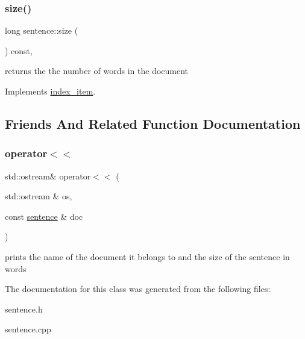 \subsubsection{\texorpdfstring{size()}{size()}}
{\footnotesize\ttfamily long sentence\+::size (\begin{DoxyParamCaption}{ }\end{DoxyParamCaption}) const\hspace{0.3cm}{\ttfamily [override]}, {\ttfamily [virtual]}}

returns the the number of words in the document 

Implements \hyperlink{classindex__item_a7c16d6bca513663fab66d40a6c0289a9}{index\+\_\+item}.



\subsection{Friends And Related Function Documentation}
\mbox{\label{classsentence_a75f010f233216c95ebc86aa5e5675574}} 
\subsubsection{\texorpdfstring{operator$<$$<$}{operator<<}}
{\footnotesize\ttfamily std\+::ostream\& operator$<$$<$ (\begin{DoxyParamCaption}\item[{std\+::ostream \&}]{os,  }\item[{const \hyperlink{classsentence}{sentence} \&}]{doc }\end{DoxyParamCaption})\hspace{0.3cm}{\ttfamily [friend]}}

prints the name of the document it belongs to and the size of the sentence in words 

The documentation for this class was generated from the following files\+:\begin{DoxyCompactItemize}
\item 
sentence.\+h\item 
sentence.\+cpp\end{DoxyCompactItemize}
